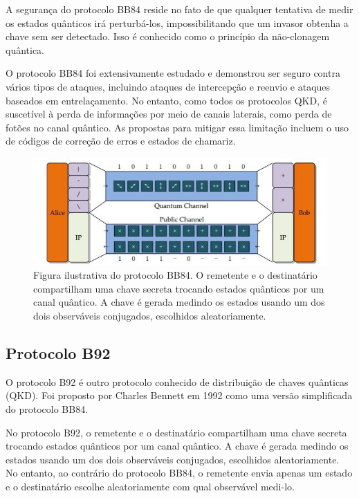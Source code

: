 A segurança do protocolo BB84 reside no fato de que qualquer tentativa de medir os estados quânticos irá perturbá-los, impossibilitando que um invasor obtenha a chave sem ser detectado. Isso é conhecido como o princípio da não-clonagem quântica.

O protocolo BB84 foi extensivamente estudado e demonstrou ser seguro contra vários tipos de ataques, incluindo ataques de intercepção e reenvio e ataques baseados em entrelaçamento. No entanto, como todos os protocolos QKD, é suscetível à perda de informações por meio de canais laterais, como perda de fotões no canal quântico. As propostas para mitigar essa limitação incluem o uso de códigos de correção de erros e estados de chamariz.

\begin{figure}[!hbt]
  \centering
  \includegraphics[width=\textwidth]{images/bb84.jpg}
  \caption{Figura ilustrativa do protocolo BB84. O remetente e o destinatário compartilham uma chave secreta trocando estados quânticos por um canal quântico. A chave é gerada medindo os estados usando um dos dois observáveis conjugados, escolhidos aleatoriamente.}
  \label{fig:bb84}
\end{figure}
\FloatBarrier

\subsection{Protocolo B92}

O protocolo B92 é outro protocolo conhecido de distribuição de chaves quânticas (QKD). Foi proposto por Charles Bennett em 1992 como uma versão simplificada do protocolo BB84.

No protocolo B92, o remetente e o destinatário compartilham uma chave secreta trocando estados quânticos por um canal quântico. A chave é gerada medindo os estados usando um dos dois observáveis conjugados, escolhidos aleatoriamente. No entanto, ao contrário do protocolo BB84, o remetente envia apenas um estado e o destinatário escolhe aleatoriamente com qual observável medi-lo.

